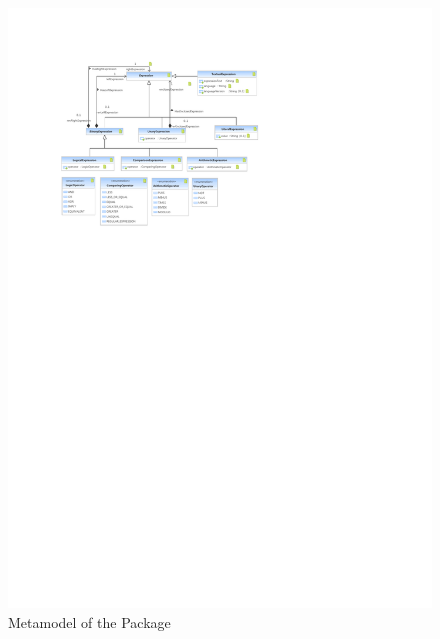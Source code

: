 %
%

\begin{figure}[htb]
  \centering
  \includegraphics[width=\textwidth]{figures/A_technical-reference/packages/core_expressions_common/core-expressions-common}
  \caption{Metamodel of the  Package}
  \label{fig:MM:expressions::common}
\end{figure}
